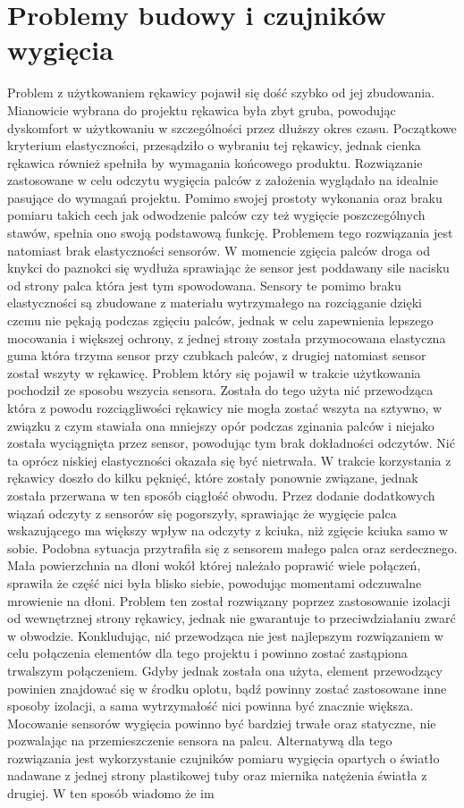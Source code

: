  \section{Problemy budowy i czujników wygięcia}
 \label{sec:iuPalce}
 Problem z użytkowaniem rękawicy pojawił się dość szybko od jej zbudowania. Mianowicie wybrana do projektu rękawica była zbyt gruba, powodując dyskomfort w użytkowaniu w szczególności przez dłuższy okres czasu. Początkowe kryterium elastyczności, przesądziło o wybraniu tej rękawicy, jednak cienka rękawica również spełniła by wymagania końcowego produktu. Rozwiązanie zastosowane w celu odczytu wygięcia palców z założenia wyglądało na idealnie pasujące do wymagań projektu. Pomimo swojej prostoty wykonania oraz braku pomiaru takich cech jak odwodzenie palców czy też wygięcie poszczególnych stawów, spełnia ono swoją podstawową funkcję. Problemem tego rozwiązania jest natomiast brak elastyczności sensorów. W momencie zgięcia palców droga od knykci do paznokci się wydłuża sprawiając że sensor jest poddawany sile nacisku od strony palca która jest tym spowodowana. Sensory te pomimo braku elastyczności są zbudowane z materiału wytrzymałego na rozciąganie dzięki czemu nie pękają podczas zgięciu palców, jednak w celu zapewnienia lepszego mocowania i większej ochrony, z jednej strony została przymocowana elastyczna guma która trzyma sensor przy czubkach palców, z drugiej natomiast sensor został wszyty w rękawicę. Problem który się pojawił w trakcie użytkowania pochodził ze sposobu wszycia sensora. Została do tego użyta nić przewodząca która z powodu rozciągliwości rękawicy nie mogła zostać wszyta na sztywno, w związku z czym stawiała ona mniejszy opór podczas zginania palców i niejako została wyciągnięta przez sensor, powodując tym brak dokładności odczytów. Nić ta oprócz niskiej elastyczności okazała się być nietrwała. W trakcie korzystania z rękawicy doszło do kilku pęknięć, które zostały ponownie związane, jednak została przerwana w ten sposób ciągłość obwodu. Przez dodanie dodatkowych wiązań odczyty z sensorów się pogorszyły, sprawiając że wygięcie palca wskazującego ma większy wpływ na odczyty z kciuka, niż zgięcie kciuka samo w sobie. Podobna sytuacja przytrafiła się z sensorem małego palca oraz serdecznego. Mała powierzchnia na dłoni wokół której należało poprawić wiele połączeń, sprawiła że część nici była blisko siebie, powodując momentami odczuwalne mrowienie na dłoni. Problem ten został rozwiązany poprzez zastosowanie izolacji od wewnętrznej strony rękawicy, jednak nie gwarantuje to przeciwdziałaniu zwarć w obwodzie. Konkludując, nić przewodząca nie jest najlepszym rozwiązaniem w celu połączenia elementów dla tego projektu i powinno zostać zastąpiona trwalszym połączeniem. Gdyby jednak została ona użyta, element przewodzący powinien znajdować się w środku oplotu, bądź powinny zostać zastosowane inne sposoby izolacji, a sama wytrzymałość nici powinna być znacznie większa. Mocowanie sensorów wygięcia powinno być bardziej trwałe oraz statyczne, nie pozwalając na przemieszczenie sensora na palcu. Alternatywą dla tego rozwiązania jest wykorzystanie czujników pomiaru wygięcia opartych o światło nadawane z jednej strony plastikowej tuby oraz miernika natężenia światła z drugiej. W ten sposób wiadomo że im 